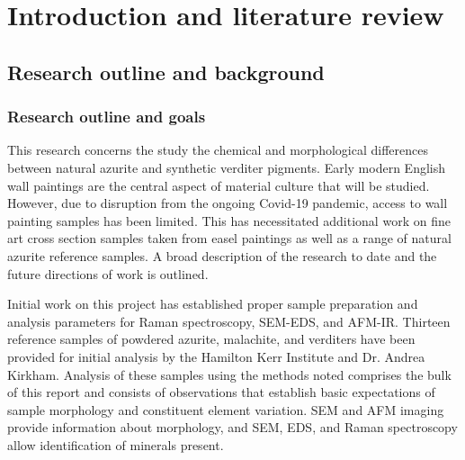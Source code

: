 

\chapter{Introduction and literature review}


\ifpdf
    \graphicspath{{Chapter1/Figs/Raster/}{Chapter1/Figs/PDF/}{Chapter1/Figs/}}
\else
    \graphicspath{{Chapter1/Figs/Vector/}{Chapter1/Figs/}}
\fi



\section[Research outline and background]{Research outline and background}
\label{section1.1}

\subsection[Research outline and goals]{Research outline and goals}
\label{subsection1.1.1}

This research concerns the study the chemical and morphological differences between natural azurite and synthetic verditer pigments. Early modern English wall paintings are the central aspect of material culture that will be studied. However, due to disruption from the ongoing Covid-19 pandemic, access to wall painting samples has been limited. This has necessitated additional work on fine art cross section samples taken from easel paintings as well as a range of natural azurite reference samples. A broad description of the research to date and the future directions of work is outlined.

Initial work on this project has established proper sample preparation and analysis parameters for Raman spectroscopy, SEM-EDS, and AFM-IR. Thirteen reference samples of powdered azurite, malachite, and verditers have been provided for initial analysis by the Hamilton Kerr Institute and Dr. Andrea Kirkham. Analysis of these samples using the methods noted comprises the bulk of this report and consists of observations that establish basic expectations of sample morphology and constituent element variation. SEM and AFM imaging provide information about morphology, and SEM, EDS, and Raman spectroscopy allow identification of minerals present.

